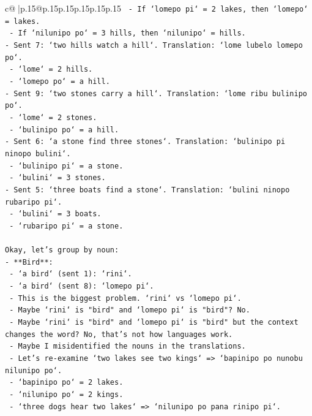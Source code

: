\documentclass{article}
\begin{document}
{\begin{supertabular}{c@{$\;$}|p{.15\linewidth}@{}p{.15\linewidth}p{.15\linewidth}p{.15\linewidth}p{.15\linewidth}p{.15\linewidth}}
{{{\texttt{  {-} If `lomepo pi` = 2 lakes, then `lomepo` = lakes.} \\
\texttt{  {-} If `nilunipo po` = 3 hills, then `nilunipo` = hills.} \\
\texttt{{-} Sent 7: `two hills watch a hill`. Translation: `lome lubelo lomepo po`.} \\
\texttt{  {-} `lome` = 2 hills.} \\
\texttt{  {-} `lomepo po` = a hill.} \\
\texttt{{-} Sent 9: `two stones carry a hill`. Translation: `lome ribu bulinipo po`.} \\
\texttt{  {-} `lome` = 2 stones.} \\
\texttt{  {-} `bulinipo po` = a hill.} \\
\texttt{{-} Sent 6: `a stone find three stones`. Translation: `bulinipo pi ninopo bulini`.} \\
\texttt{  {-} `bulinipo pi` = a stone.} \\
\texttt{  {-} `bulini` = 3 stones.} \\
\texttt{{-} Sent 5: `three boats find a stone`. Translation: `bulini ninopo rubaripo pi`.} \\
\texttt{  {-} `bulini` = 3 boats.} \\
\texttt{  {-} `rubaripo pi` = a stone.} \\
\\ 
\texttt{Okay, let's group by noun:} \\
\texttt{{-} **Bird**:} \\
\texttt{  {-} `a bird` (sent 1): `rini`.} \\
\texttt{  {-} `a bird` (sent 8): `lomepo pi`.} \\
\texttt{  {-} This is the biggest problem. `rini` vs `lomepo pi`.} \\
\texttt{  {-} Maybe `rini` is "bird" and `lomepo pi` is "bird"? No.} \\
\texttt{  {-} Maybe `rini` is "bird" and `lomepo pi` is "bird" but the context changes the word? No, that's not how languages work.} \\
\texttt{  {-} Maybe I misidentified the nouns in the translations.} \\
\texttt{  {-} Let's re{-}examine `two lakes see two kings` => `bapinipo po nunobu nilunipo po`.} \\
\texttt{    {-} `bapinipo po` = 2 lakes.} \\
\texttt{    {-} `nilunipo po` = 2 kings.} \\
\texttt{  {-} `three dogs hear two lakes` => `nilunipo po pana rinipo pi`.} \\
}}}
\end{supertabular}}
\end{document}
